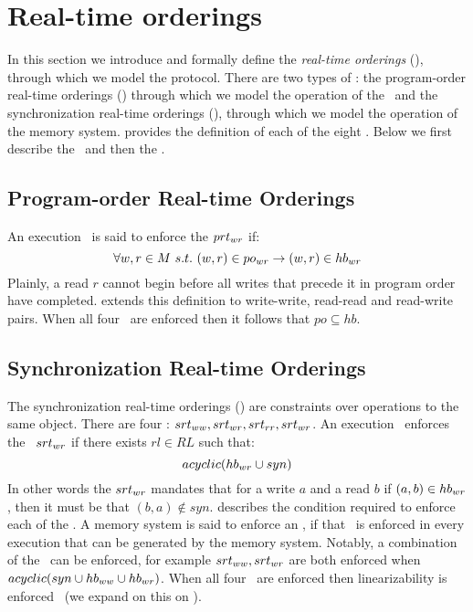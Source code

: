 \section{Real-time orderings}\label{sec:rt}
In this section we introduce and formally define the \emph{real-time orderings} (\rts), through which we model the protocol.
There are two types of \rts: the program-order real-time orderings (\emph{\prts}) through which we model the operation of the \rob\ and the synchronization real-time orderings (\emph{\srts}), through which we model the operation of the memory system.
 provides the definition of each of the eight \rts. 
Below we first describe the \prts\ and then the \srts.


\subsection{Program-order Real-time Orderings}


An execution \Exec\ is said to enforce the $prt_{wr}$ if:
\begin{equation*}
  \forall w,r \in M\ s.t.\ (w,r) \in po_{wr} \rightarrow  (w,r) \in hb_{wr}
\end{equation*}%
Plainly, a read $r$ cannot begin before all writes that precede it in program order have completed. 
 extends this definition to write-write, read-read and read-write pairs. When all four \prts\ are enforced then it follows that 
$po \subseteq hb$.






\subsection{Synchronization Real-time Orderings}
The synchronization real-time orderings (\srts) are constraints over operations to the same object.
There are four \srts: $srt_{ww}, srt_{wr}, srt_{rr}, srt_{wr}$.
An execution \Exec\ enforces the \srt\ $srt_{wr}$ if there exists $rl \in RL$ such that:
\begin{equation*}
    acyclic(hb_{wr} \cup syn)
\end{equation*}
In other words the $srt_{wr}$ mandates that for a write $a$ and a read $b$ if $(a , b) \in hb_{wr}$, then it must be that $(b, a) \notin syn$.
 describes the condition required to enforce each of the \srts.
A memory system is said to enforce an \srt, if that \srt\ is enforced in every execution that can be generated by the memory system.
Notably, a combination of the \srts\ can be enforced, for example $srt_{ww}, srt_{wr}$ are both enforced when $acyclic (syn \cup hb_{ww} \cup hb_{wr})$. 
When all four \srts\ are enforced then linearizability is enforced~\cite{Herlihy:1990} (we expand on this on ).











